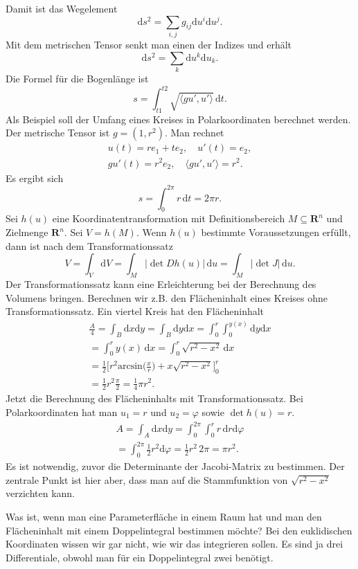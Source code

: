 \documentclass[a4paper,10pt,fleqn,twocolumn,twoside]{article}
\begin{document}
Damit ist das Wegelement
\[\mathrm ds^2 = \sum_{i,j} g_{ij}\mathrm du^i\mathrm du^j.\]
Mit dem metrischen Tensor senkt man einen der Indizes
und erhält
\[\mathrm ds^2 = \sum_{k}\mathrm du^k\mathrm du_k.\]
Die Formel für die Bogenlänge ist
\[s = \int_{t1}^{t2}
\sqrt{\langle gu',u'\rangle}\,\mathrm dt.\]
%
Als Beispiel soll der Umfang eines Kreises in Polarkoordinaten
berechnet werden. Der metrische Tensor ist $g=(1,r^2)$.
Man rechnet
\begin{gather*}
u(t)=re_1+te_2,\quad
u'(t) = e_2,\\
gu'(t) = r^2e_2,\quad
\langle gu',u'\rangle = r^2.
\end{gather*}
Es ergibt sich
\[s = \int_0^{2\pi} r\,\mathrm dt = 2\pi r.\]
%
Sei $h(u)$ eine Koordinatentransformation mit Definitionsbereich
$M\subseteq\mathbf R^n$ und Zielmenge $\mathbf R^n$.
Sei $V=h(M)$. Wenn $h(u)$ bestimmte Voraussetzungen erfüllt,
dann ist nach dem Transformationssatz
\[V = \int_V \mathrm dV = \int_M |{\det Dh(u)}|\,\mathrm du
= \int_M |{\det J}|\,\mathrm du.\]
Der Transformationssatz kann eine Erleichterung bei der Berechnung
des Volumens bringen. Berechnen wir z.B. den Flächeninhalt eines
Kreises ohne Transformationssatz. Ein viertel Kreis hat den
Flächeninhalt
\begin{gather*}
\frac{A}{4} = \int_B \mathrm dx\mathrm dy
= \int_B \mathrm dy\mathrm dx
= \int_{0}^r\int_{0}^{y(x)} \mathrm dy\mathrm dx\\
= \int_{0}^r y(x)\,\mathrm dx
= \int_{0}^r \sqrt{r^2-x^2}\,\mathrm dx\\
= \frac{1}{2}\Big[r^2\mathrm{arcsin}\Big(\frac{x}{r}\Big)
+ x\sqrt{r^2-x^2}\Big]_0^r\\
= \frac{1}{2} r^2 \frac{\pi}{2}
= \frac{1}{4}\pi r^2.
\end{gather*}
Jetzt die Berechnung des Flächeninhalts mit Transformationssatz.
Bei Polarkoordinaten hat man $u_1=r$ und $u_2=\varphi$
sowie $\det h(u)=r$.
\begin{gather*}
A = \int_A \mathrm dx\mathrm dy
= \int_0^{2\pi}\int_0^r r\,\mathrm dr\mathrm d\varphi\\
= \int_0^{2\pi} \frac{1}{2}r^2\mathrm d\varphi
= \frac{1}{2}r^2\,2\pi = \pi r^2.
\end{gather*}
Es ist notwendig, zuvor die Determinante der Jacobi-Matrix zu
bestimmen. Der zentrale Punkt ist hier aber, dass man auf die
Stammfunktion von $\sqrt{r^2-x^2}$ verzichten kann.

Was ist, wenn man eine Parameterfläche in einem Raum hat und man den
Flächeninhalt mit einem Doppelintegral bestimmen möchte? Bei den
euklidischen Koordinaten wissen wir gar nicht, wie wir das integrieren
sollen. Es sind ja drei Differentiale, obwohl man für ein
Doppelintegral zwei benötigt.
\end{document}
